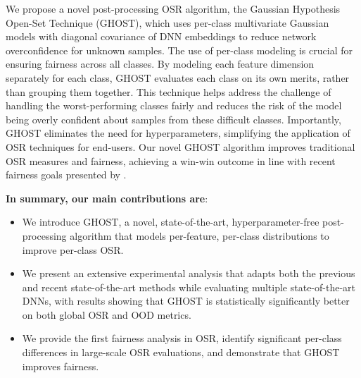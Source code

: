 We propose a novel post-processing OSR algorithm, the Gaussian Hypothesis Open-Set Technique (GHOST), which uses per-class multivariate Gaussian models with diagonal covariance of DNN embeddings to reduce network overconfidence for unknown samples.
The use of per-class modeling is crucial for ensuring fairness across all classes.
By modeling each feature dimension separately for each class, GHOST evaluates each class on its own merits, rather than grouping them together.
This technique helps address the challenge of handling the worst-performing classes fairly and reduces the risk of the model being overly confident about samples from these difficult classes.
Importantly, GHOST eliminates the need for hyperparameters, simplifying the application of OSR techniques for end-users.
Our novel GHOST algorithm improves traditional OSR measures and fairness, achieving a win-win outcome in line with recent fairness goals presented by \citet{islam2021can,li2023accurate}.


\noindent\textbf{In summary, our main contributions are}:
\begin{itemize}
    \item We introduce GHOST, a novel, state-of-the-art, hyper\-parameter-free post-processing algorithm that models per-feature, per-class distributions to improve per-class OSR.
    \item We present an extensive experimental analysis that adapts both the previous and recent state-of-the-art methods while evaluating multiple state-of-the-art DNNs, with results showing that GHOST is statistically significantly better on both global OSR and OOD metrics.
    \item We provide the first fairness analysis in OSR, identify significant per-class differences in large-scale OSR evaluations, and demonstrate that GHOST improves fairness.
\end{itemize}


